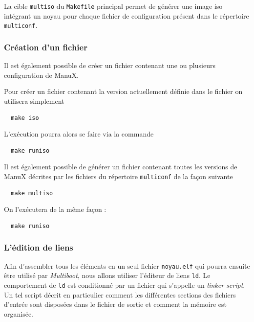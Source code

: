    La cible {\tt multiso} du {\tt Makefile} principal permet de
générer une image {\sc iso} intégrant un noyau pour chaque fichier de
configuration présent dans le répertoire {\tt multiconf}.

%
\subsubsection{Création d'un fichier \iso}

   Il est également possible de créer un fichier \iso contenant une ou
plusieurs configuration de ManuX.

   Pour créer un fichier \iso contenant la version actuellement
définie dans le fichier  on
utilisera simplement

\begin{lstlisting}
  make iso
\end{lstlisting}

   L'exécution pourra alors se faire via la commande

\begin{lstlisting}
  make runiso
\end{lstlisting}

   Il est également possible de générer un fichier \iso contenant
toutes les versions de ManuX décrites par les fichiers du répertoire
\lstinline!multiconf! de la façon suivante

\begin{lstlisting}
  make multiso
\end{lstlisting}

On l'exécutera de la même façon :

\begin{lstlisting}
  make runiso
\end{lstlisting}
   
%
\subsubsection{L'édition de liens}

   Afin d'assembler tous les éléments en un seul fichier
\lstinline!noyau.elf! qui pourra ensuite être utilisé par {\em
  Multiboot}, nous allons utiliser l'éditeur de liens \lstinline!ld!.
Le comportement de \lstinline!ld! est conditionné par un fichier qui
s'appelle un {\em linker script}. Un tel script décrit en particulier
comment les différentes sections des fichiers d'entrée sont disposées
dans le fichier de sortie et comment la mémoire est organisée.

